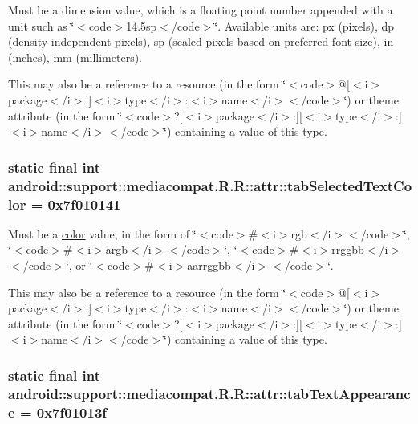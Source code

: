 Must be a dimension value, which is a floating point number appended with a unit such as \char`\"{}$<$code$>$14.5sp$<$/code$>$\char`\"{}. Available units are: px (pixels), dp (density-independent pixels), sp (scaled pixels based on preferred font size), in (inches), mm (millimeters). 

This may also be a reference to a resource (in the form \char`\"{}$<$code$>$@\mbox{[}$<$i$>$package$<$/i$>$:\mbox{]}$<$i$>$type$<$/i$>$:$<$i$>$name$<$/i$>$$<$/code$>$\char`\"{}) or theme attribute (in the form \char`\"{}$<$code$>$?\mbox{[}$<$i$>$package$<$/i$>$:\mbox{]}\mbox{[}$<$i$>$type$<$/i$>$:\mbox{]}$<$i$>$name$<$/i$>$$<$/code$>$\char`\"{}) containing a value of this type. \hypertarget{classandroid_1_1support_1_1mediacompat_1_1_r_1_1attr_18465dceee7b5ebd5b5f904738f05b46}{
\subsubsection[{tabSelectedTextColor}]{\setlength{\rightskip}{0pt plus 5cm}static final int android::support::mediacompat.R.R::attr::tabSelectedTextColor = 0x7f010141}}
\label{classandroid_1_1support_1_1mediacompat_1_1_r_1_1attr_18465dceee7b5ebd5b5f904738f05b46}


Must be a \hyperlink{classandroid_1_1support_1_1mediacompat_1_1_r_1_1color}{color} value, in the form of \char`\"{}$<$code$>$\#$<$i$>$rgb$<$/i$>$$<$/code$>$\char`\"{}, \char`\"{}$<$code$>$\#$<$i$>$argb$<$/i$>$$<$/code$>$\char`\"{}, \char`\"{}$<$code$>$\#$<$i$>$rrggbb$<$/i$>$$<$/code$>$\char`\"{}, or \char`\"{}$<$code$>$\#$<$i$>$aarrggbb$<$/i$>$$<$/code$>$\char`\"{}. 

This may also be a reference to a resource (in the form \char`\"{}$<$code$>$@\mbox{[}$<$i$>$package$<$/i$>$:\mbox{]}$<$i$>$type$<$/i$>$:$<$i$>$name$<$/i$>$$<$/code$>$\char`\"{}) or theme attribute (in the form \char`\"{}$<$code$>$?\mbox{[}$<$i$>$package$<$/i$>$:\mbox{]}\mbox{[}$<$i$>$type$<$/i$>$:\mbox{]}$<$i$>$name$<$/i$>$$<$/code$>$\char`\"{}) containing a value of this type. \hypertarget{classandroid_1_1support_1_1mediacompat_1_1_r_1_1attr_e2afab8a063cf4dc75ef5bc5efc8a4a8}{
\subsubsection[{tabTextAppearance}]{\setlength{\rightskip}{0pt plus 5cm}static final int android::support::mediacompat.R.R::attr::tabTextAppearance = 0x7f01013f}}
\label{classandroid_1_1support_1_1mediacompat_1_1_r_1_1attr_e2afab8a063cf4dc75ef5bc5efc8a4a8}


